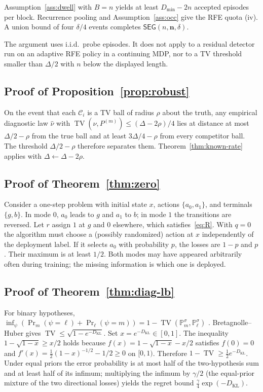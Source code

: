 \documentclass[11pt]{article}
\newcommand{\TV}{\operatorname{TV}}
\newcommand{\KL}{D_{\mathrm{KL}}}
\newcommand{\SEG}{\mathsf{SEG}}
\newcommand{\Prb}{\Pr}
\newcommand{\cC}{\mathcal{C}}
\begin{document}
Assumption~\ref{ass:dwell} with $B=n$ yields at least
$D_{\min}-2n$ accepted episodes per block. Recurrence pooling and
Assumption~\ref{ass:occ} give the RFE quota (iv). A union bound of four
$\delta/4$ events completes $\SEG(n,\mathbf{n},\delta)$.

The argument uses i.i.d.\ probe episodes. It does not apply to a residual
detector run on an adaptive RFE policy in a continuing MDP, nor to a TV
threshold smaller than $\Delta/2$ with $n$ below the displayed length.

\subsection{Proof of Proposition~\ref{prop:robust}}
On the event that each $\cC_i$ is a TV ball of radius $\rho$ about the truth,
any empirical diagnostic law $\widehat\nu$ with
$\TV(\widehat\nu,P^{(m)})\le(\Delta-2\rho)/4$ lies at distance at most
$\Delta/2-\rho$ from the true ball and at least $3\Delta/4-\rho$ from every
competitor ball. The threshold $\Delta/2-\rho$ therefore separates them.
Theorem~\ref{thm:known-rate} applies with $\Delta\leftarrow\Delta-2\rho$.

\subsection{Proof of Theorem~\ref{thm:zero}}
Consider a one-step problem with initial state $x$, actions $\{a_0,a_1\}$, and
terminals $\{g,b\}$. In mode $0$, $a_0$ leads to $g$ and $a_1$ to $b$; in
mode $1$ the transitions are reversed. Let $r$ assign $1$ at $g$ and $0$
elsewhere, which satisfies~\eqref{eq:R}. With $q=0$ the algorithm must choose
a (possibly randomized) action at $x$ independently of the deployment label.
If it selects $a_0$ with probability $p$, the losses are $1-p$ and $p$. Their
maximum is at least $1/2$. Both modes may have appeared arbitrarily often
during training; the missing information is which one is deployed.

\subsection{Proof of Theorem~\ref{thm:diag-lb}}
For binary hypotheses,
$\inf_\psi(\Prb_m(\psi=\ell)+\Prb_\ell(\psi=m))
=1-\TV(\mathbb{P}_m^\sigma,\mathbb{P}_\ell^\sigma)$
\citep{lecam1973convergence}. Bretagnolle--Huber
\citep{bretagnolle1978estimation,canonne2023short} gives
$\TV\le\sqrt{1-e^{-\KL}}$. Set $x=e^{-\KL}\in[0,1]$. The inequality
$1-\sqrt{1-x}\ge x/2$ holds because
$f(x)=1-\sqrt{1-x}-x/2$ satisfies $f(0)=0$ and
$f'(x)=\tfrac12(1-x)^{-1/2}-1/2\ge 0$ on $[0,1)$. Therefore
$1-\TV\ge \tfrac12 e^{-\KL}$. Under equal priors the error probability is
at most half of the two-hypothesis sum and at least half of its infimum;
multiplying the infimum by $\gamma/2$ (the equal-prior mixture of the two
directional losses) yields the regret bound
$\tfrac{\gamma}{4}\exp(-\KL)$.
\end{document}
